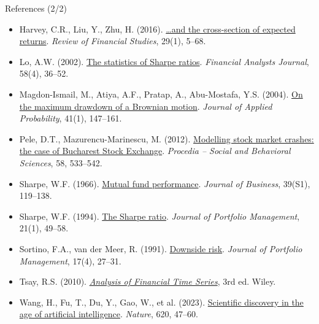 \begin{frame}{References (2/2)}
\itemsize{\tiny}
\begin{itemize}
    \item Harvey, C.R., Liu, Y., Zhu, H. (2016). \href{https://doi.org/10.1093/rfs/hhv059}{\ldots and the cross-section of expected returns}. \textit{Review of Financial Studies}, 29(1), 5--68.
    \item Lo, A.W. (2002). \href{https://doi.org/10.2469/faj.v58.n4.2453}{The statistics of Sharpe ratios}. \textit{Financial Analysts Journal}, 58(4), 36--52.
    \item Magdon-Ismail, M., Atiya, A.F., Pratap, A., Abu-Mostafa, Y.S. (2004). \href{https://doi.org/10.1239/jap/1077134674}{On the maximum drawdown of a Brownian motion}. \textit{Journal of Applied Probability}, 41(1), 147--161.
    \item Pele, D.T., Mazurencu-Marinescu, M. (2012). \href{https://doi.org/10.1016/j.sbspro.2012.09.1030}{Modelling stock market crashes: the case of Bucharest Stock Exchange}. \textit{Procedia -- Social and Behavioral Sciences}, 58, 533--542.
    \item Sharpe, W.F. (1966). \href{https://doi.org/10.1086/294846}{Mutual fund performance}. \textit{Journal of Business}, 39(S1), 119--138.
    \item Sharpe, W.F. (1994). \href{https://doi.org/10.3905/jpm.1994.409501}{The Sharpe ratio}. \textit{Journal of Portfolio Management}, 21(1), 49--58.
    \item Sortino, F.A., van der Meer, R. (1991). \href{https://doi.org/10.3905/jpm.1991.409343}{Downside risk}. \textit{Journal of Portfolio Management}, 17(4), 27--31.
    \item Tsay, R.S. (2010). \href{https://doi.org/10.1002/9780470644560}{\textit{Analysis of Financial Time Series}}, 3rd ed. Wiley.
    \item Wang, H., Fu, T., Du, Y., Gao, W., et al. (2023). \href{https://doi.org/10.1038/s41586-023-06221-2}{Scientific discovery in the age of artificial intelligence}. \textit{Nature}, 620, 47--60.
\end{itemize}
\end{frame}


